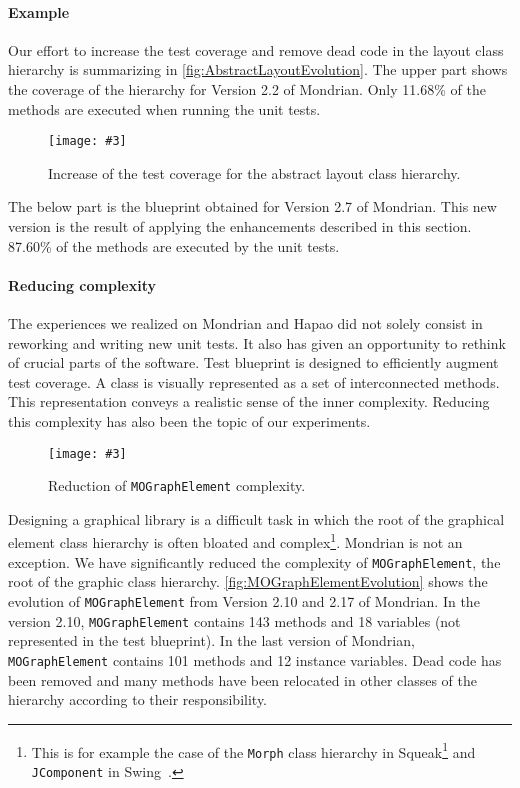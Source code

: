 \documentclass[runningheads]{llncs}
\newcommand{\ct}{\lstinline[backgroundcolor=\color{white},basicstyle=\footnotesize\ttfamily]}
\newcommand{\fig}[4]{
	\begin{figure}[#1]
		\centering
		\texttt{[image: \#3]}
		\caption{\label{fig:#3}#4}
	\end{figure}}
\newcommand{\largefig}[4]{
	\begin{figure*}[#1]
		\centering
		\texttt{[image: \#3]}
		\caption{\label{fig:#3}#4}
	\end{figure*}}
\begin{document}
\paragraph{Example} Our effort to increase the test coverage and remove dead code in the layout class hierarchy is summarizing in \autoref{fig:AbstractLayoutEvolution}. The upper part shows the coverage of the hierarchy for Version 2.2 of Mondrian.  Only 11.68\% of the methods are executed when running the unit tests.

\fig{}{1.0}{AbstractLayoutEvolution}{Increase of the test coverage for the abstract layout class hierarchy.}

The below part is the blueprint obtained for Version 2.7 of Mondrian. This new version is the result of applying the enhancements described in this section. 87.60\% of the methods are executed by the unit tests. 

\paragraph{Reducing complexity}

The experiences we realized on Mondrian and Hapao did not solely consist in reworking and writing new unit tests. It also has given an opportunity to rethink of crucial parts of the software. Test blueprint is designed to efficiently augment test coverage. A class is visually represented as a set of interconnected methods. This representation conveys a realistic sense of the inner complexity. Reducing this complexity has also been the topic of our experiments.

\largefig{}{1.0}{MOGraphElementEvolution}{Reduction of \ct{MOGraphElement} complexity.}

Designing a graphical library is a difficult task in which the root of the graphical element class hierarchy is often bloated and complex\footnote{This is for example the case of the \ct{Morph} class hierarchy in Squeak\footnote{\url{http://www.oldenbuettel.de/squeak-doku/Morphic-Kernel/Morph.html}} and \ct{JComponent} in Swing~\cite{Berg05b}.}. Mondrian is not an exception. We have significantly reduced the complexity of \ct{MOGraphElement}, the root of the graphic class hierarchy. \autoref{fig:MOGraphElementEvolution} shows the evolution of \ct{MOGraphElement} from Version 2.10 and 2.17 of Mondrian. In the version 2.10, \ct{MOGraphElement} contains 143 methods and 18 variables (not represented in the test blueprint). In the last version of Mondrian, \ct{MOGraphElement} contains 101 methods and 12 instance variables. Dead code has been removed and many methods have been relocated in other classes of the hierarchy according to their responsibility.
\end{document}
